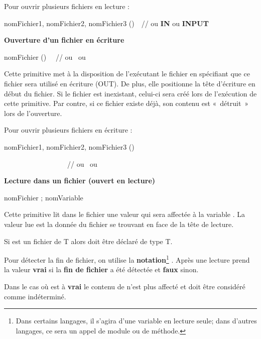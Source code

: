 {
Pour ouvrir plusieurs fichiers en lecture :}

{\sffamily
{} nomFichier1, nomFichier2, nomFichier3
()\ \ // ou \textbf{IN }ou\textbf{ INPUT}}

{\sffamily\bfseries\upshape
Ouverture d’un fichier en écriture }

{\sffamily
{} nomFichier () \ \ // ou
 \ ou }

{
Cette primitive met à la disposition de l’exécutant le fichier
 en spécifiant que ce fichier sera
utilisé en écriture (OUT). De plus, elle positionne la tête d’écriture
en début du fichier. Si le fichier  est
inexistant, celui-ci sera créé lors de l’exécution de cette primitive.
Par contre, si ce fichier existe déjà, son contenu est «~détruit~» lors
de l'ouverture.}

{
Pour ouvrir plusieurs fichiers en écriture :}

{\sffamily
{} nomFichier1, nomFichier2, nomFichier3
() \ \ }

{\sffamily
\ \ \ \ \ \ \ \ \ \ \ \ \ \ \ \ \ \ // ou  \ ou
}

{\sffamily\bfseries\upshape
Lecture dans un fichier (ouvert en lecture) }

{\sffamily
{} nomFichier ; nomVariable }

{
Cette primitive lit dans le fichier  une
valeur qui sera affectée à la variable .
La valeur lue est la donnée du fichier se trouvant en face de la tête
de lecture. }

{
Si  est un fichier de T alors
 doit être déclaré de type T.}

{
Pour détecter la fin de fichier, on utilise la
\textbf{notation}\footnote{Dans certains langages, il
s'agira d'une variable en lecture
seule; dans d'autres langages, ce sera un appel de
module ou de méthode.}\textbf{ }.
Après une lecture  prend la valeur
\textbf{vrai} si la \textbf{fin de fichier} a été détectée et
\textbf{faux }sinon. }

{
Dans le cas où  est à
\textbf{vrai}\textstyleCodeInsr{,} le contenu de
 n’est plus affecté et doit être
considéré comme indéterminé. }

